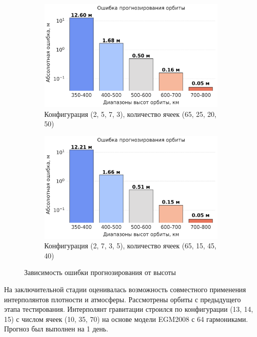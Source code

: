 \begin{figure}[htbp]
    \begin{subfigure}[b]{0.48\textwidth}
        \includegraphics[width=\linewidth]{../images/solution/atmo/propagation/2573.png}
        \caption{Конфигурация (2, 5, 7, 3),
        количество ячеек (65, 25, 20, 50)}
        \label{fig:atmo:2573_propag}
    \end{subfigure}
    \hfill
    \begin{subfigure}[b]{0.48\textwidth}
        \includegraphics[width=\linewidth]{../images/solution/atmo/propagation/2735.png}
        \caption{Конфигурация (2, 7, 3, 5),
        количество ячеек (65, 15, 45, 40)}
        \label{fig:atmo:2735_propag}
    \end{subfigure}
    \caption{Зависимость ошибки прогнозирования от высоты}
    \label{fig:all_images}
\end{figure}

На заключительной стадии оценивалась возможность совместного применения интерполянтов
плотности и атмосферы. Рассмотрены орбиты с предыдущего этапа тестирования. 
Интерполянт гравитации строился по конфигурации (13, 14, 15) с числом ячеек (10, 35, 70)
на основе модели EGM2008 с 64 гармониками.
Прогноз был выполнен на 1 день. 

